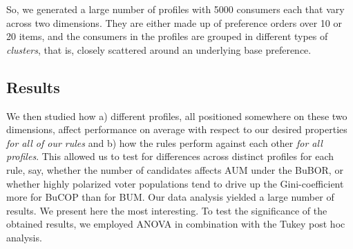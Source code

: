 \documentclass{article}
\begin{document}
So, we generated a large number of profiles with 5000 consumers each that vary across two dimensions. They are either made up of preference orders over 10 or 20 items, and the consumers in the profiles are grouped in different types of \emph{clusters}, that is, closely scattered around an underlying base preference.
\subsection{Results}
We then studied how a) different profiles, all positioned somewhere on these two dimensions, affect performance on average with respect to our desired properties \emph{for all of our rules} and b) how the rules perform against each other \emph{for all profiles}. This allowed us to test for differences across distinct profiles for each rule, say, whether the number of candidates affects AUM under the BuBOR, or whether highly polarized voter populations tend to drive up the Gini-coefficient more for BuCOP than for BUM.
Our data analysis yielded a large number of results. We present here the most interesting. To test the significance of the obtained results, we employed ANOVA in combination with the Tukey post hoc analysis.
\end{document}
